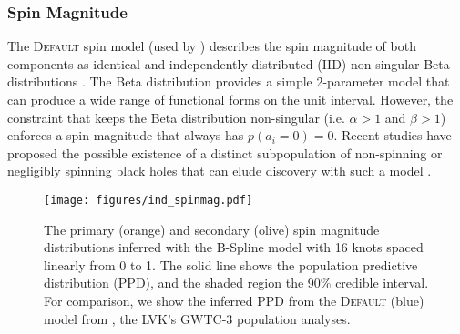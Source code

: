 \subsubsection{Spin Magnitude}

The \textsc{Default} spin model (used by \citet{o3b_astro_dist}) describes the spin magnitude of both components as identical and independently distributed (IID) non-singular Beta distributions \citep{Talbot_2017,Wysocki_2019}.
The Beta distribution provides a simple 2-parameter model that can produce a wide range of functional forms on the unit interval. However, the constraint that keeps 
the Beta distribution non-singular (i.e. $\alpha>1$ and $\beta>1$) enforces a spin magnitude that always has $p(a_i=0) = 0$. Recent studies have proposed the possible existence of a 
distinct subpopulation of non-spinning or negligibly spinning black holes that can elude discovery with such a model \citep{FullerMa2019,RouletGWTC2Pop,BuildBetterSpinModels,Callister_NoEvidence,GWTC3MonashSpin}. 

\begin{figure} 
    \begin{centering}
        \texttt{[image: figures/ind\_spinmag.pdf]}
        \caption{The primary (orange) and secondary (olive) spin magnitude distributions inferred with the B-Spline model
        with 16 knots spaced linearly from 0 to 1. The solid line shows the population predictive distribution (PPD), and the shaded region the 90\% credible interval. 
        For comparison, we show the inferred PPD from the \textsc{Default} (blue) model from \citet{o3b_astro_dist}, the LVK's GWTC-3 population analyses.}
        \label{fig:ind_spinmag_dist}
    \end{centering}
\end{figure}

